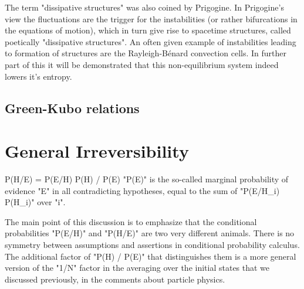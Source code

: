 \documentclass[a4paper,12pt]{article}
\begin{document}
The term "dissipative structures" was also coined by Prigogine.
In Prigogine's view the fluctuations are the trigger for the instabilities (or rather bifurcations in the equations of motion), which in turn give rise to spacetime structures, called poetically "dissipative structures". 
An often given example of instabilities leading to formation of structures are the Rayleigh-Bénard convection cells. In further part of this it will be demonstrated that this non-equilibrium system indeed lowers it's entropy.

\subsection{Green-Kubo relations}

\section{General Irreversibility}

P(H/E) = P(E/H) P(H) / P(E)
"P(E)" is the so-called marginal probability of evidence "E" in all contradicting hypotheses, equal to the sum of "P(E/H_i) P(H_i)" over "i".

 The main point of this discussion is to emphasize that the conditional probabilities "P(E/H)" and "P(H/E)" are two very different animals. There is no symmetry between assumptions and assertions in conditional probability calculus. The additional factor of "P(H) / P(E)" that distinguishes them is a more general version of the "1/N" factor in the averaging over the initial states that we discussed previously, in the comments about particle physics.



\end{document}

